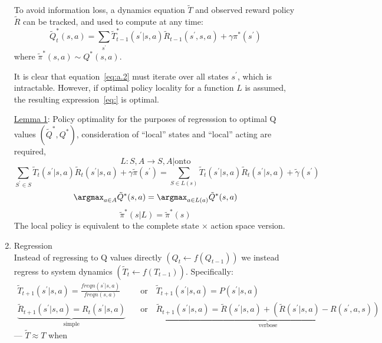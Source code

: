 \begin{enumerate}[label=1.0.\arabic*]
To avoid information loss, a dynamics equation $\tilde{T}$ and observed reward policy $\tilde{R}$ can be tracked, and used to compute at any
 time:
\begin{equation}
\tilde{Q}^\ast_t( s, a ) = \sum_{s^\prime} \tilde{T}_{t-1}^\ast ( s^\prime | s, a ) \tilde{R}_{t-1}( s^\prime, s, a ) + \gamma \pi^\ast( s^\prime ) \label{eq:a.2} 
\end{equation}
where $\tilde{\pi}^\ast( s, a ) \sim Q^\ast( s, a )$. 

It is clear that equation~\ref{eq:a.2} must iterate over all states $s^\prime$, which is intractable. However, if optimal policy locality for a function $L$ is assumed, the resulting expression~\ref{eq:} is optimal.

\underline{Lemma 1}: Policy optimality for the purposes of regresssion to optimal Q values $(\tilde{Q}^\ast, Q^\ast )$, consideration of ``local'' states and ``local'' acting are required,
\begin{equation}
L:S,A\to S,A | \text{onto}
\end{equation}
\begin{equation}
\sum_{S^\prime \in S} \tilde{T}_t ( s^\prime | s, a ) \tilde{R}_t( s^\prime | s, a ) +\gamma \tilde{\pi}( s^\prime )  = \sum_{S \in L(s)}  \tilde{T}_{t}( s^\prime | s, a ) \tilde{R}_t( s^\prime | s, a ) + \tilde{\gamma}( s^\prime )
\end{equation}
\begin{equation}
\argmax_{a \in A}\tilde{Q}^\ast( s, a ) = \argmax_{a\in L(a)} \tilde{Q}^\ast( s, a )
\end{equation}
\begin{equation}
\tilde{\pi}^\ast( s | L ) = \tilde{\pi}^\ast( s )
\end{equation}
The local policy is equivalent to the complete state $\times$ action space version.\\

\item Regression \\
Instead of regressing to Q values directly $\left( Q_t \leftarrow f(Q_{t-1}) \right)$ we instead regress to system dynamics $\left( \tilde{T}_t \leftarrow f( T_{t-1} ) \right)$. Specifically:
\begin{align}
\tilde{T}_{t+1}( s^\prime | s, a ) = \frac{\textit{freqn}(s^\prime | s, a )}{\textit{freqn}( s, a )} & \quad\text{or}\quad \tilde{T}_{t+1}( s^\prime | s, a ) = P( s^\prime | s, a ) \\
\underbrace{\tilde{R}_{t+1}( s^\prime | s, a ) = R_t( s^\prime | s, a )}_{\text{simple}} & \quad\text{or}\quad \underbrace{\tilde{R}_{t+1}( s^\prime | s, a ) = \tilde{R}( s^\prime | s, a ) + \left( \tilde{R}( s^\prime | s, a ) - R( s^\prime, a, s ) \right)}_{\text{verbose}} 
\end{align}
\textasteriskcentered --- $\tilde{T} \approx T$ when


\end{enumerate}
